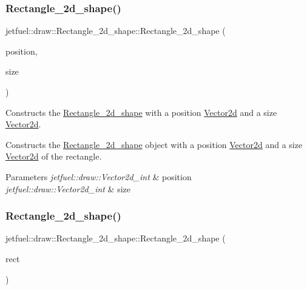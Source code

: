 \subsubsection{\texorpdfstring{Rectangle\+\_\+2d\+\_\+shape()}{Rectangle\_2d\_shape()}\hspace{0.1cm}{\footnotesize\ttfamily [1/2]}}
{\footnotesize\ttfamily jetfuel\+::draw\+::\+Rectangle\+\_\+2d\+\_\+shape\+::\+Rectangle\+\_\+2d\+\_\+shape (\begin{DoxyParamCaption}\item[{\hyperlink{classjetfuel_1_1draw_1_1Vector2d}{Vector2d\+\_\+int}}]{position,  }\item[{\hyperlink{classjetfuel_1_1draw_1_1Vector2d}{Vector2d\+\_\+int}}]{size }\end{DoxyParamCaption})}



Constructs the \hyperlink{classjetfuel_1_1draw_1_1Rectangle__2d__shape}{Rectangle\+\_\+2d\+\_\+shape} with a position \hyperlink{classjetfuel_1_1draw_1_1Vector2d}{Vector2d} and a size \hyperlink{classjetfuel_1_1draw_1_1Vector2d}{Vector2d}. 

Constructs the \hyperlink{classjetfuel_1_1draw_1_1Rectangle__2d__shape}{Rectangle\+\_\+2d\+\_\+shape} object with a position \hyperlink{classjetfuel_1_1draw_1_1Vector2d}{Vector2d} and a size \hyperlink{classjetfuel_1_1draw_1_1Vector2d}{Vector2d} of the rectangle.


\begin{DoxyParams}{Parameters}
{\em jetfuel\+::draw\+::\+Vector2d\+\_\+int} & position \\
\hline
{\em jetfuel\+::draw\+::\+Vector2d\+\_\+int} & size \\
\hline
\end{DoxyParams}
\mbox{\label{classjetfuel_1_1draw_1_1Rectangle__2d__shape_a5b75e1dc1fe55ecf69b551888d78e352}} 
\subsubsection{\texorpdfstring{Rectangle\+\_\+2d\+\_\+shape()}{Rectangle\_2d\_shape()}\hspace{0.1cm}{\footnotesize\ttfamily [2/2]}}
{\footnotesize\ttfamily jetfuel\+::draw\+::\+Rectangle\+\_\+2d\+\_\+shape\+::\+Rectangle\+\_\+2d\+\_\+shape (\begin{DoxyParamCaption}\item[{\hyperlink{classjetfuel_1_1draw_1_1Rect2d}{Rect2d\+\_\+int}}]{rect }\end{DoxyParamCaption})}




